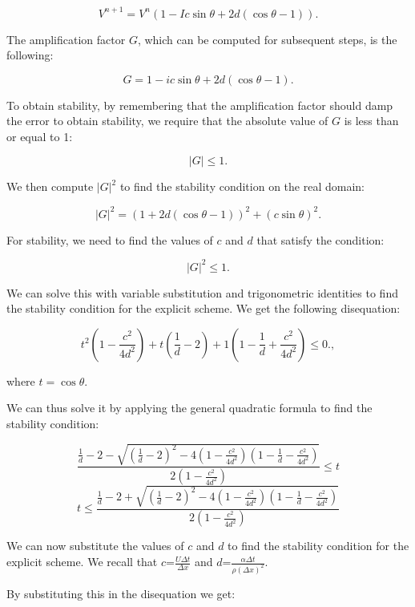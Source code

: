 \documentclass{article}
\begin{document}
\[
V^{n+1} = V^n \left(1 - I c \sin \theta + 2d (\cos \theta - 1)\right).
\]

The amplification factor $G$, which can be computed for subsequent steps, is the following:

\[
G = 1 - i c \sin \theta + 2d (\cos \theta - 1).
\]

To obtain stability, by remembering that the amplification factor should damp the error to obtain stability, we require that the absolute value of $G$ is less than or equal to 1:

\[
|G| \leq 1.
\]

We then compute $|G|^2$ to find the stability condition on the real domain:

\[
|G|^2 = \left(1 + 2d (\cos \theta - 1)\right)^2 + (c \sin \theta)^2.
\]

For stability, we need to find the values of $c$ and $d$ that satisfy the condition:

\[
|G|^2 \leq 1.
\]

We can solve this with variable substitution and trigonometric identities to find the stability condition for the explicit scheme.
We get the following disequation:

\[
t^2(1-\frac{c^2}{4d^2}) + t(\frac{1}{d}-2) + 1 (1-\frac{1}{d}+\frac{c^2}{4d^2}) \leq 0.,
\]

where \(t = \cos \theta\).

We can thus solve it by applying the general quadratic formula to find the stability condition:

\begin{equation}
\frac{\frac{1}{d}-2-\sqrt{(\frac{1}{d}-2)^2-4(1-\frac{c^2}{4d^2})(1-\frac{1}{d}-\frac{c^2}{4d^2})}}{2(1-\frac{c^2}{4d^2})}\leq t
\end{equation}
\begin{equation}
t \leq \frac{\frac{1}{d}-2+\sqrt{(\frac{1}{d}-2)^2-4(1-\frac{c^2}{4d^2})(1-\frac{1}{d}-\frac{c^2}{4d^2})}}{2(1-\frac{c^2}{4d^2})}
\end{equation}

We can now substitute the values of \(c\) and \(d\) to find the stability condition for the explicit scheme.
We recall that \(c\)=\(\frac{U \Delta t}{\Delta x}\) and \(d\)=\(\frac{\alpha \Delta t}{\rho (\Delta x)^2}\).

By substituting this in the disequation we get:
\end{document}
